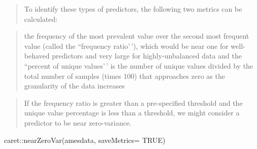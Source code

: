 \documentclass[
]{book}
\newenvironment{Shaded}{\begin{snugshade}}{\end{snugshade}}
\newcommand{\AttributeTok}[1]{\textcolor[rgb]{0.77,0.63,0.00}{#1}}
\newcommand{\ConstantTok}[1]{\textcolor[rgb]{0.00,0.00,0.00}{#1}}
\newcommand{\FunctionTok}[1]{\textcolor[rgb]{0.00,0.00,0.00}{#1}}
\newcommand{\NormalTok}[1]{#1}
\newcommand{\SpecialCharTok}[1]{\textcolor[rgb]{0.00,0.00,0.00}{#1}}
\begin{document}
\begin{quote}
To identify these types of predictors, the following two metrics can be calculated:
\end{quote}

\begin{quote}
the frequency of the most prevalent value over the second most frequent value (called the ``frequency ratio'\,'), which would be near one for well-behaved predictors and very large for highly-unbalanced data and
the ``percent of unique values'\,' is the number of unique values divided by the total number of samples (times 100) that approaches zero as the granularity of the data increases
\end{quote}

\begin{quote}
If the frequency ratio is greater than a pre-specified threshold and the unique value percentage is less than a threshold, we might consider a predictor to be near zero-variance.
\end{quote}

\begin{Shaded}
\begin{Highlighting}[]
\NormalTok{caret}\SpecialCharTok{::}\FunctionTok{nearZeroVar}\NormalTok{(amesdata, }\AttributeTok{saveMetrics=} \ConstantTok{TRUE}\NormalTok{)}
\end{Highlighting}
\end{Shaded}
\end{document}
